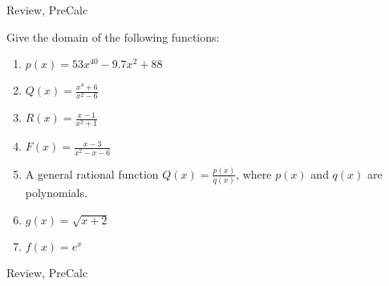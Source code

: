 \begin{tagblock}{Review, PreCalc}
\begin{question}
 Give the domain of the following functions:
\begin{enumerate}
\item  $p(x) = 53x^{40}-9.7x^2 + 88$
\vspace{.2in}


\item  $\displaystyle Q(x) = \frac{x^4+6}{x^2-6}$

\vspace{.2in}

\item  $\displaystyle R(x) = \frac{x - 1}{x^2+1}$
\vspace{.4in}

\item $\displaystyle F(x) = \frac{x-3}{x^2 -x -6}$
\vspace{.4in}

\item  A general rational function $\displaystyle Q(x) = \frac{p(x)}{q(x)}$, where $p(x)$ and $q(x)$ are polynomials.  
\vspace{.4in}

\item $g(x) = \sqrt{x+2}$

\vspace{.4in}
\item $f(x) = e^x$


\end{enumerate}
	
 

\begin{tags}
	    Review, PreCalc
\end{tags}
	
\begin{diary}
	    
\end{diary}
	
\begin{solution}
		
\end{solution}
	
\end{question}

\end{tagblock}

 

